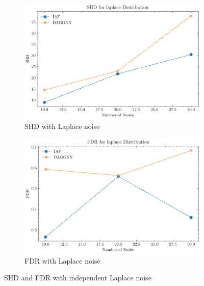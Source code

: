 \documentclass[10pt]{article}
\begin{document}
\begin{figure}[H]
    \centering
    \begin{subfigure}{0.45\textwidth}
        \includegraphics[width=\textwidth]{fig/SHD_independence_laplace.pdf}
        \caption{SHD with Laplace noise}
        \label{SHD_laplace}
    \end{subfigure}
    \hfill
    \begin{subfigure}{0.45\textwidth}
        \includegraphics[width=\textwidth]{fig/FDR_independence_laplace.pdf}
        \caption{FDR with Laplace noise}
        \label{FDR_laplace}
    \end{subfigure}
    \caption{SHD and FDR with independent Laplace noise}
    \label{SHD_FDR_laplace}
\end{figure}
\end{document}
